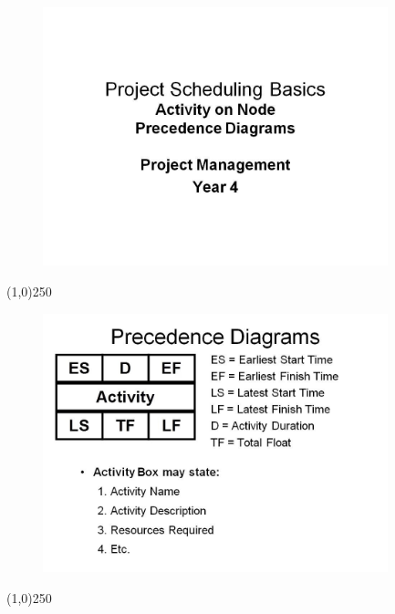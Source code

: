 \begin{frame}
\begin{figure}
	\centering
		\includegraphics[width = 10.0cm]{oldnotes/Slide124.jpg}
\end{figure}
\end{frame}
\begin{center}\line(1,0){250}\end{center}


\begin{frame}
\begin{figure}
	\centering
		\includegraphics[width = 10.0cm]{oldnotes/Slide125.jpg}
\end{figure}
\end{frame}
\begin{center}\line(1,0){250}\end{center}


